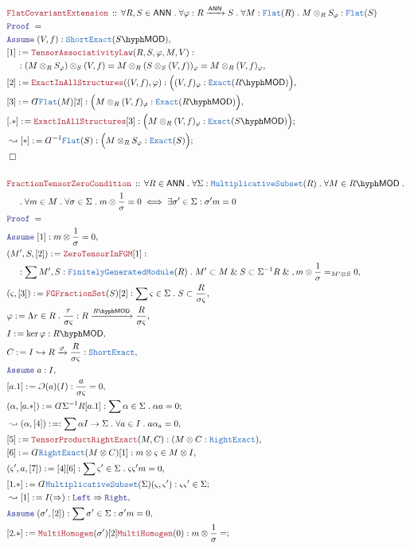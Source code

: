 \documentclass[12pt]{scrartcl}%
\newcommand{\TYPE}[1]{\textcolor{NavyBlue}{\mathtt{#1}}}%
\newcommand{\LOGIC}[1]{\textcolor{Blue}{\mathtt{#1}}}%
\newcommand{\THM}[1]{\textcolor{Maroon}{\mathtt{#1}}}%
\renewcommand{\.}{\; . \;} %
\newcommand{\de}{: \kern 0.1pc =} %
\newcommand{\Theorem}[2]{& \THM{#1} \, :: \, #2 \\ & \Proof = \\ } %
\newcommand{\NewLine}{\\ & \kern 1pc}%
\newcommand{\Page}[1]{ \begin{align*} #1 \end{align*}  }%
\newcommand{ \bd }{ \ByDef }%
\renewcommand{\And}{\; \& \;}%
\newcommand{\ToInj}{\hookrightarrow} %
\newcommand{\Say}[3]{& #1 \de #2 : #3, \\} %
\newcommand{\Conclude}[3]{& #1 \de #2 : #3; \\}%
\newcommand{\Derive}[3]{& \leadsto #1 \de #2 : #3, \\} %
\newcommand{\DeriveConclude}[3]{& \leadsto #1 \de #2 : #3 ; \\} %
\newcommand{\Assume}[2]{& \LOGIC{Assume} \; #1 : #2, \\} %
\newcommand{\QED}{\; \square} %
\newcommand{\EndProof}{& \QED \\} %
\newcommand{\ByDef}{\rotatebox[origin=c]{-180}{$D$}}%
\newcommand{\ByConstr}{\rotatebox[origin=c]{-180}{$C$}}%
\newcommand{\Proof}{\LOGIC{Proof} \; } %
\newcommand{\Arrow}[1]{\xrightarrow{#1}}%
\newcommand{\FGM}{\TYPE{FinitelyGeneratedModule}}%
\newcommand{\LMOD}[1]{#1\hyph\mathsf{MOD}} %
\newcommand{\MS}{\TYPE{MultiplicativeSubset}}
\newcommand{\ANN}{\mathsf{ANN}} %
\begin{document}
\Page{
	\Theorem{FlatCovariantExtension}{
			\forall R,S \in \ANN \.
			\forall \varphi : R \Arrow{\ANN} S \.
			\forall M : \TYPE{Flat}(R) \.
			M \otimes_R S_\varphi : \TYPE{Flat}(S)
		}                  
	\Assume{(V,f)}{\TYPE{ShortExact}(\LMOD{S})}
	\Say{[1]}{\THM{TensorAssociativityLaw}(R,S,\varphi,M,V)}{ 
		\NewLine : (M \otimes_R S_{\varphi}) \otimes_S (V,f) = M \otimes_R (S \otimes_S (V,f))_{\varphi}  = M \otimes_R (V,f)_\varphi}
	\Say{[2]}{\THM{ExactInAllStructures}((V,f),\varphi)}{ \Big( (V,f)_\varphi : \TYPE{Exact}(\LMOD{R})\Big) }
	\Say{[3]}{\bd \TYPE{Flat}(M)[2]}{\Big( M \otimes_R (V,f)_\varphi : \TYPE{Exact}(\LMOD{R})  \Big)}        
	\Conclude{[.*]}{\THM{ExactInAllStructures}[3]}{ \Big( M \otimes_R (V,f)_\varphi : \TYPE{Exact}(\LMOD{S}) \Big)  }
	\DeriveConclude{[*]}{\bd^{-1}\TYPE{Flat}(S)}{\Big(M \otimes_R S_\varphi : \TYPE{Exact}(S)\Big)}
	\EndProof
	\\
	\Theorem{FractionTensorZeroCondition}{
		\forall  R \in \ANN \.
		\forall  \Sigma : \MS(R) \.
		\forall M \in \LMOD{R} \. \NewLine \.  
		\forall m \in M \.
		\forall \sigma \in \Sigma \.
		m \otimes \frac{1}{\sigma} = 0 \iff
		\exists \sigma' \in \Sigma : \sigma' m = 0
	}
	\Assume{[1]}{m \otimes \frac{1}{\sigma} = 0}
	\Say{(M',S,[2])}{\THM{ZeroTensorInFGM}[1]}
	{ \NewLine : \sum M',S : \FGM(R) \. M' \subset M \And S \subset \Sigma^{-1} R \And , m \otimes  \frac{1}{\sigma} =_{M' \otimes S} 0  }
	\Say{(\varsigma,[3])}{\THM{FGFractionSet}(S)[2]}{ \sum \varsigma \in \Sigma \. S \subset \frac{R}{\sigma\varsigma}}
	\Say{\varphi}{\Lambda r \in R \. \frac{r}{\sigma\varsigma}}{ R \Arrow{\LMOD{R}} \frac{R}{\sigma\varsigma}    }
	\Say{I}{\ker \varphi}{\LMOD{R}}
	\Say{C}{ I \ToInj R \Arrow{\varphi} \frac{R}{\sigma\varsigma}}{\TYPE{ShortExact}}
	\Assume{a}{I}
	\Say{[a.1]}{\ByConstr(a)(I)}{ \frac{a}{\sigma \varsigma} = 0 }
	\Conclude{(\alpha,[a.*])}{\bd \Sigma^{-1}R[a.1]}{ \sum \alpha \in \Sigma \. \alpha a = 0  }
	\Derive{(\alpha,[4])}{}{\sum \alpha I \to \Sigma \. \forall a \in I \. a \alpha_a = 0}
	\Say{[5]}{\THM{TensorProductRightExact}(M,C)}{ (M \otimes C : \TYPE{RightExact})}
	\Say{[6]}{\bd \TYPE{RightExact}(M \otimes C)[1]}{ m \otimes \varsigma \in M \otimes I }
	\Say{(\varsigma',a,[7])}{[4][6]}{ \sum \varsigma' \in \Sigma \. \varsigma \varsigma' m = 0 }
	\Conclude{[1.*]}{\bd \MS(\Sigma)(\varsigma,\varsigma')}{\varsigma\varsigma' \in \Sigma}
	\Derive{[1]}{I(\Rightarrow)}{\LOGIC{Left} \Rightarrow \LOGIC{Right}}
	\Assume{(\sigma',[2])}{ \sum \sigma' \in \Sigma : \sigma' m = 0}
	\Conclude{[2.*] }{ \THM{MultiHomogen}(\sigma')[2]\THM{MultiHomogen}(0)}{
		m \otimes \frac{1}{\sigma} = 
}}
\end{document}
